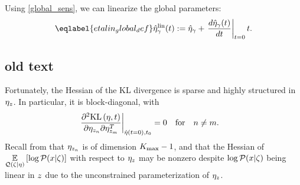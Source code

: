 Using \eqref{global_sens}, we can linearize the global parameters:
\begin{align}\eqlabel{etalin_global_def}
  \etalin_\gamma(\t) := \etaopt_\gamma +
  \fracat{d \etaopt_\gamma(\t)}{d \t}{\t=0} \t .
\end{align}



\subsection*{old text}








  Fortunately, the Hessian of the KL divergence
is sparse and highly structured in $\eta_{z}$.  In particular, it is
block-diagonal, with
%
\begin{align*}
%
\fracat{\partial^2 \KL{\eta, \t}}
       {\partial \eta_{\z_{n}} \partial \eta_{\z_{m}}^T}
       {\etaopt(t = 0), \t_0} ={}& 0 \mathtxt{for}n\ne m.
%
\end{align*}
%
Recall from  that $\eta_{z_n}$ is of dimension ${K_{\mathrm{max}}} -
1$, and that the Hessian of $\underset{\mathcal{Q}(\zeta \vert \eta)}{\mathbb{E}}\left[\log \mathcal{P}(x \vert
\zeta)\right]$ with respect to $\eta_{z}$ may be nonzero despite $\log \mathcal{P}(x \vert \zeta)$
being linear in $z$ due to the unconstrained parameterization of $\eta_{z}$.

